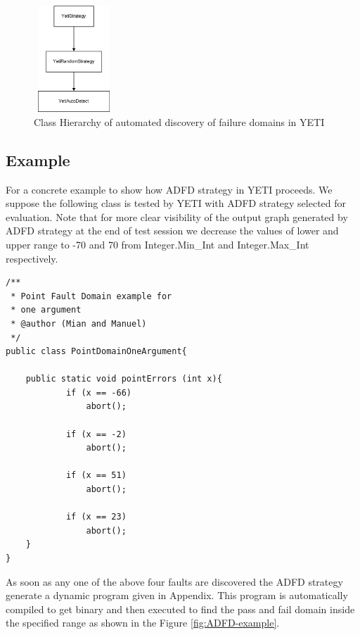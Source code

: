 \documentclass{acm_proc_article-sp}
\begin{document}
\begin{figure}[htp]
\centering
\includegraphics[width=3cm,height=4cm]{Hierarchy1.png}
\caption{Class Hierarchy of automated discovery of failure domains in YETI}
\label{fig:hierarchy}
\end{figure}

\subsection{Example}\label{sec:example}
For a concrete example to show how ADFD strategy in YETI proceeds. We suppose the following class is tested by YETI with ADFD strategy selected for evaluation. Note that for more clear visibility of the output graph generated by ADFD strategy at the end of test session we decrease the values of lower and upper range to -70 and 70 from Integer.Min\_Int and Integer.Max\_Int respectively. 


\begin{lstlisting}
/**
 * Point Fault Domain example for 
 * one argument
 * @author (Mian and Manuel)
 */
public class PointDomainOneArgument{

	public static void pointErrors (int x){
     		if (x == -66)
       			abort();
     
     		if (x == -2)
     			abort();
      				
     		if (x == 51)
     			abort();
     
     		if (x == 23)
     			abort();
	}
}
\end{lstlisting}


As soon as any one of the above four faults are discovered the ADFD strategy generate a dynamic program given in Appendix. This program is automatically compiled to get binary and then executed to find the pass and fail domain inside the specified range as shown in the Figure \ref{fig:ADFD-example}.
\end{document}
